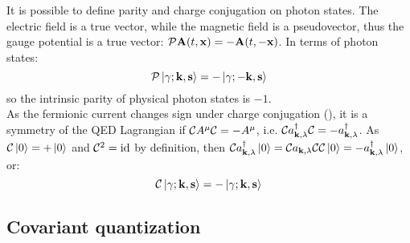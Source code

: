 It is possible to define parity and charge conjugation on photon states. The electric field is a true vector, while the magnetic field is a pseudovector, thus the gauge potential is a true vector: $ \mathcal{P} \mathbf{A}(t,\mathbf{x}) = - \mathbf{A}(t,-\mathbf{x}) $. In terms of photon states:
\begin{equation}
  \mathcal{P} \ket{\gamma ; \mathbf{k}, \mathbf{s}} = - \ket{\gamma ; -\mathbf{k}, \mathbf{s}}
\end{equation}
so the intrinsic parity of physical photon states is $ -1 $. \\
As the fermionic current changes sign under charge conjugation (), it is a symmetry of the QED Lagrangian if $ \mathcal{C} A^\mu \mathcal{C} = - A^\mu $, i.e. $ \mathcal{C} a_{\mathbf{k},\lambda}^\dagger \mathcal{C} = - a_{\mathbf{k},\lambda}^\dagger $. As $ \mathcal{C} \ket{0} = +\ket{0} $ and $ \mathcal{C}^2 = \operatorname{id} $ by definition, then $ \mathcal{C} a_{\mathbf{k},\lambda}^\dagger \ket{0} = \mathcal{C} a_{\mathbf{k},\lambda} \mathcal{C} \mathcal{C} \ket{0} = - a_{\mathbf{k},\lambda}^\dagger \ket{0} $, or:
\begin{equation}
  \mathcal{C} \ket{\gamma ; \mathbf{k} , \mathbf{s}} = - \ket{\gamma ; \mathbf{k} , \mathbf{s}}
\end{equation}

\subsection{Covariant quantization}

